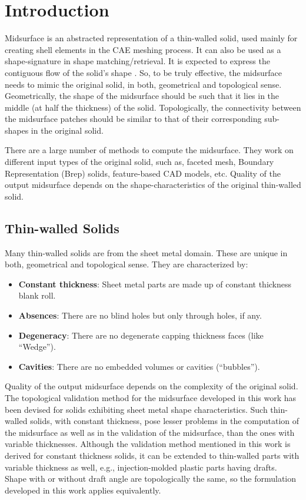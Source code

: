 \section{Introduction}

Midsurface is an abstracted representation of a thin-walled solid, used mainly for creating shell elements in the CAE meshing process. It can also be used as a shape-signature in shape matching/retrieval. It is expected to express the contiguous flow of the solid's shape  \cite{Rezayat1996}. So, to be truly effective, the midsurface needs to mimic the original solid, in both, geometrical and topological sense. Geometrically, the shape of the midsurface should be such that it lies in the middle (at half the thickness) of the solid. Topologically, the connectivity between the midsurface patches should be similar to that of their corresponding sub-shapes in the original solid. 

There are a large number of methods to compute the midsurface. They work on different input types of the original solid, such as, faceted mesh, Boundary Representation (Brep) solids, feature-based CAD models, etc. Quality of the output midsurface depends on the shape-characteristics of the original thin-walled solid.

\subsection{Thin-walled Solids}
Many thin-walled solids are from the sheet metal domain. These are unique in both, geometrical and topological sense. They are characterized by:
\begin{itemize}[noitemsep,topsep=2pt,parsep=2pt,partopsep=2pt,leftmargin=*]
\item \textbf{Constant thickness}: Sheet metal parts are made up of constant thickness blank roll.
\item \textbf{Absences}: There are no blind holes but only through holes, if any. 
\item \textbf{Degeneracy}: There are no degenerate capping thickness faces (like ``Wedge'').
\item \textbf{Cavities}: There are no embedded volumes or cavities (``bubbles'').
\end{itemize}

Quality of the output midsurface depends on the complexity of the original solid. The topological validation method for the midsurface developed in this work has been devised for solids exhibiting sheet metal shape characteristics. Such thin-walled solids, with constant thickness, pose lesser problems in the computation of the midsurface as well as in the validation of the midsurface, than the ones with variable thicknesses. Although the validation method mentioned in this work is derived for constant thickness solids, it can be extended to thin-walled parts with variable thickness as well, e.g., injection-molded plastic parts having drafts. Shape with or without draft angle are topologically the same, so the formulation developed in this work applies equivalently.

